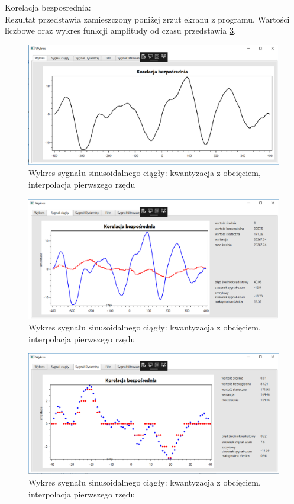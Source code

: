 \documentclass[12pt]{article}
\begin{document}
Korelacja bezposrednia:
\\Rezultat przedstawia zamieszczony poniżej zrzut ekranu z programu. Wartości liczbowe oraz wykres funkcji amplitudy od czasu przedstawia \ref{Wykres dla wynikw eksperymentu pierwszego}.
\begin{figure}[h!]
 \centering
 \includegraphics[width=12.3cm]{korB.PNG}
 \vspace{-0.3cm}
 \caption{Wykres sygnału sinusoidalnego ciągły: kwantyzacja z obcięciem, interpolacja pierwszego rzędu}
 \label{Wykres dla wynikw eksperymentu pierwszego}
\end{figure}
 \newpage
\begin{figure}[h!]
 \centering
 \includegraphics[width=12.3cm]{korBC.PNG}
 \vspace{-0.3cm}
 \caption{Wykres sygnału sinusoidalnego ciągły: kwantyzacja z obcięciem, interpolacja pierwszego rzędu}
 \label{Wykres dla wynikw eksperymentu pierwszego}
\end{figure}

\newpage
\begin{figure}[h!]
 \centering
 \includegraphics[width=12.3cm]{korBD.PNG}
 \vspace{-0.3cm}
 \caption{Wykres sygnału sinusoidalnego ciągły: kwantyzacja z obcięciem, interpolacja pierwszego rzędu}
 \label{Wykres dla wynikw eksperymentu pierwszego}
\end{figure}
\end{document}
